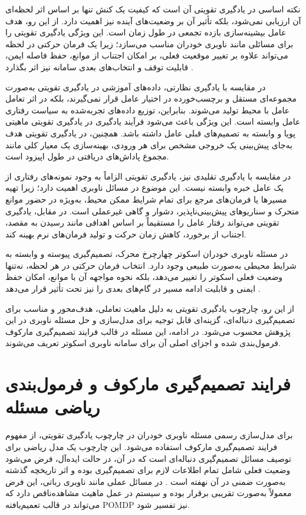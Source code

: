 نکته اساسی در یادگیری تقویتی آن است که کیفیت یک کنش تنها بر اساس اثر لحظه‌ای آن ارزیابی نمی‌شود، بلکه تأثیر آن بر وضعیت‌های آینده نیز اهمیت دارد. از این رو، هدف عامل بیشینه‌سازی بازده تجمعی در طول زمان است. این ویژگی یادگیری تقویتی را برای مسائلی مانند ناوبری خودران مناسب می‌سازد؛ زیرا یک فرمان حرکتی در لحظه می‌تواند علاوه بر تغییر موقعیت فعلی، بر امکان اجتناب از موانع، حفظ فاصله ایمن، قابلیت توقف و انتخاب‌های بعدی سامانه نیز اثر بگذارد %
\cite{SuttonBarto2018}.

در مقایسه با یادگیری نظارتی، داده‌های آموزشی در یادگیری تقویتی به‌صورت مجموعه‌ای مستقل و برچسب‌خورده در اختیار عامل قرار نمی‌گیرند، بلکه در اثر تعامل عامل با محیط تولید می‌شوند. بنابراین، توزیع داده‌های تجربه‌شده به سیاست رفتاری عامل وابسته است. این ویژگی باعث می‌شود فرآیند یادگیری در یادگیری تقویتی ماهیتی پویا و وابسته به تصمیم‌های قبلی عامل داشته باشد. همچنین، در یادگیری تقویتی هدف به‌جای پیش‌بینی یک خروجی مشخص برای هر ورودی، بهینه‌سازی یک معیار کلی مانند مجموع پاداش‌های دریافتی در طول اپیزود است.

در مقایسه با یادگیری تقلیدی نیز، یادگیری تقویتی الزاماً به وجود نمونه‌های رفتاری از یک عامل خبره وابسته نیست. این موضوع در مسائل ناوبری اهمیت دارد؛ زیرا تهیه مسیرها یا فرمان‌های مرجع برای تمام شرایط ممکن محیط، به‌ویژه در حضور موانع متحرک و سناریوهای پیش‌بینی‌ناپذیر، دشوار و گاهی غیرعملی است. در مقابل، یادگیری تقویتی می‌تواند رفتار عامل را مستقیماً بر اساس اهدافی مانند رسیدن به مقصد، اجتناب از برخورد، کاهش زمان حرکت و تولید فرمان‌های نرم بهینه کند.

در مسئله ناوبری خودران اسکوتر چهارچرخ محرک، تصمیم‌گیری پیوسته و وابسته به شرایط محیطی به‌صورت طبیعی وجود دارد. انتخاب فرمان حرکتی در هر لحظه، نه‌تنها وضعیت فعلی اسکوتر را تغییر می‌دهد، بلکه نحوه مواجهه آن با موانع، امکان حفظ ایمنی و قابلیت ادامه مسیر در گام‌های بعدی را نیز تحت تأثیر قرار می‌دهد %
\cite{Zhu2021}. %
 
 از این رو، چارچوب یادگیری تقویتی به دلیل ماهیت تعاملی، هدف‌محور و مناسب برای تصمیم‌گیری دنباله‌ای، گزینه‌ای قابل توجیه برای مدل‌سازی و حل مسئله ناوبری در این پژوهش محسوب می‌شود. در ادامه، این مسئله در قالب فرایند تصمیم‌گیری مارکوف فرمول‌بندی شده و اجزای اصلی آن برای سامانه ناوبری اسکوتر تعریف می‌شوند.%


\section{فرایند تصمیم‌گیری مارکوف و فرمول‌بندی ریاضی مسئله}

برای مدل‌سازی رسمی مسئله ناوبری خودران در چارچوب یادگیری تقویتی، از مفهوم فرایند تصمیم‌گیری مارکوف%
استفاده می‌شود. این چارچوب یک مدل ریاضی برای توصیف مسائل تصمیم‌گیری دنباله‌ای است که در آن، در حالت ایده‌آل، فرض می‌شود وضعیت فعلی شامل تمام اطلاعات لازم برای تصمیم‌گیری بوده و اثر تاریخچه گذشته به‌صورت ضمنی در آن نهفته است %
\cite{SuttonBarto2018}. در مسائل عملی مانند ناوبری رباتی، این فرض معمولاً به‌صورت تقریبی برقرار بوده و سیستم در عمل ماهیت مشاهده‌ناقص دارد که می‌تواند در قالب تعمیم‌یافته POMDP
 نیز تفسیر شود.

